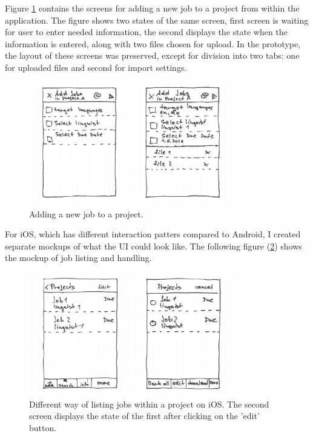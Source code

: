 Figure \ref{mock4} contains the screens for adding a new job to a project from within the application. The figure shows two states of the same screen, first screen is waiting for user to enter needed information, the second displays the state when the information is entered, along with two files chosen for upload. In the prototype, the layout of these screens was preserved, except for division into two tabs: one for uploaded files and second for import settings.

\begin{figure}[H]
	\includegraphics[width=0.8\textwidth]{pics/addJobs}
	\caption{Adding a new job to a project.}
	\label{mock4}
\end{figure}

For iOS, which has different interaction patters compared to Android, I created separate mockups of what the UI could look like. The following figure (\ref{mock5}) shows the mockup of job listing and handling.



\begin{figure}[H]
	\includegraphics[width=0.8\textwidth]{pics/iosProjs2}
	\caption{Different way of listing jobs within a project on iOS. The second screen displays the state of the first after clicking on the 'edit' button.}
	\label{mock5}
\end{figure}

